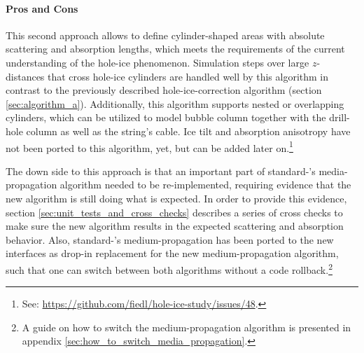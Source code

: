 \paragraph{Pros and Cons}
This second approach allows to define cylinder-shaped areas with absolute scattering and absorption lengths, which meets the requirements of the current understanding of the hole-ice phenomenon.
Simulation steps over large $z$-distances that cross hole-ice cylinders are handled well by this algorithm in contrast to the previously described hole-ice-correction algorithm (section \ref{sec:algorithm_a}).
Additionally, this algorithm supports nested or overlapping cylinders, which can be utilized to model bubble column together with the drill-hole column as well as the string's cable.
Ice tilt and absorption anisotropy have not been ported to this algorithm, yet, but can be added later on.\footnote{See: \url{https://github.com/fiedl/hole-ice-study/issues/48}.}

The down side to this approach is that an important part of standard-\clsim's media-propagation algorithm needed to be re-implemented, requiring evidence that the new algorithm is still doing what is expected. In order to provide this evidence, section \ref{sec:unit_tests_and_cross_checks} describes a series of cross checks to make sure the new algorithm results in the expected scattering and absorption behavior.
Also, standard-\clsim's medium-propagation has been ported to the new interfaces as drop-in replacement for the new medium-propagation algorithm, such that one can switch between both algorithms without a code rollback.\footnote{A guide on how to switch the medium-propagation algorithm is presented in appendix \ref{sec:how_to_switch_media_propagation}.}


